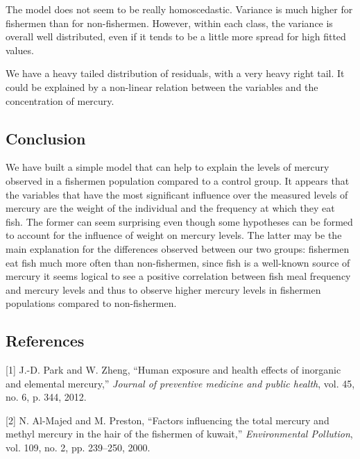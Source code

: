 \documentclass[12pt,]{article}
\begin{document}
The model does not seem to be really homoscedastic. Variance is much
higher for fishermen than for non-fishermen. However, within each class,
the variance is overall well distributed, even if it tends to be a
little more spread for high fitted values.

We have a heavy tailed distribution of residuals, with a very heavy
right tail. It could be explained by a non-linear relation between the
variables and the concentration of mercury.

\subsection{Conclusion}\label{conclusion}

We have built a simple model that can help to explain the levels of
mercury observed in a fishermen population compared to a control group.
It appears that the variables that have the most significant influence
over the measured levels of mercury are the weight of the individual and
the frequency at which they eat fish. The former can seem surprising
even though some hypotheses can be formed to account for the influence
of weight on mercury levels. The latter may be the main explanation for
the differences observed between our two groups: fishermen eat fish much
more often than non-fishermen, since fish is a well-known source of
mercury it seems logical to see a positive correlation between fish meal
frequency and mercury levels and thus to observe higher mercury levels
in fishermen populations compared to non-fishermen.

\subsection*{References}\label{references}

\hypertarget{refs}{}
\hypertarget{ref-park2012human}{}
{[}1{]} J.-D. Park and W. Zheng, ``Human exposure and health effects of
inorganic and elemental mercury,'' \emph{Journal of preventive medicine
and public health}, vol. 45, no. 6, p. 344, 2012.

\hypertarget{ref-al2000factors}{}
{[}2{]} N. Al-Majed and M. Preston, ``Factors influencing the total
mercury and methyl mercury in the hair of the fishermen of kuwait,''
\emph{Environmental Pollution}, vol. 109, no. 2, pp. 239--250, 2000.
\end{document}
